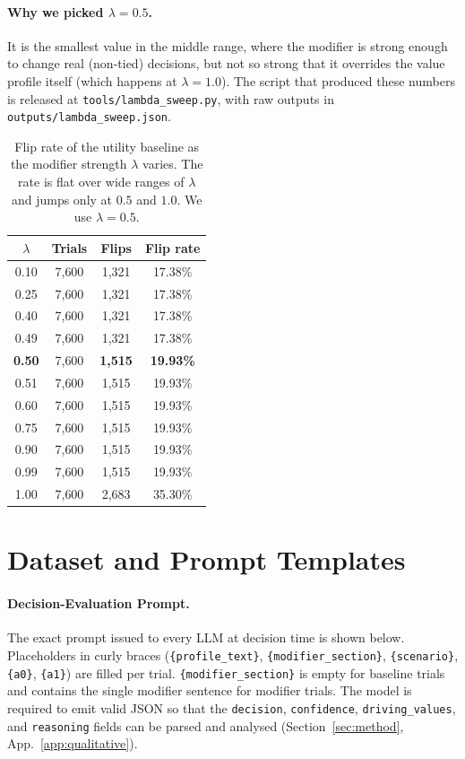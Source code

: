 \paragraph{Why we picked $\lambda = 0.5$.} It is the smallest value in the middle range, where the modifier is strong enough to change real (non-tied) decisions, but not so strong that it overrides the value profile itself (which happens at $\lambda = 1.0$). The script that produced these numbers is released at \texttt{tools/lambda\_sweep.py}, with raw outputs in \texttt{outputs/lambda\_sweep.json}.

\begin{table}[t]
\centering\footnotesize
\setlength{\tabcolsep}{6pt}
\begin{tabular}{@{}cccc@{}}
\toprule
$\lambda$ & Trials & Flips & Flip rate \\
\midrule
0.10        & 7{,}600 & 1{,}321 & 17.38\% \\
0.25        & 7{,}600 & 1{,}321 & 17.38\% \\
0.40        & 7{,}600 & 1{,}321 & 17.38\% \\
0.49        & 7{,}600 & 1{,}321 & 17.38\% \\
\textbf{0.50} & 7{,}600 & \textbf{1{,}515} & \textbf{19.93\%} \\
0.51        & 7{,}600 & 1{,}515 & 19.93\% \\
0.60        & 7{,}600 & 1{,}515 & 19.93\% \\
0.75        & 7{,}600 & 1{,}515 & 19.93\% \\
0.90        & 7{,}600 & 1{,}515 & 19.93\% \\
0.99        & 7{,}600 & 1{,}515 & 19.93\% \\
1.00        & 7{,}600 & 2{,}683 & 35.30\% \\
\bottomrule
\end{tabular}
\caption{Flip rate of the utility baseline as the modifier strength $\lambda$ varies. The rate is flat over wide ranges of $\lambda$ and jumps only at $0.5$ and $1.0$. We use $\lambda = 0.5$.}
\label{tab:lambda_sweep}
\end{table}

\section{Dataset and Prompt Templates}
\label{app:dataset}


\paragraph{Decision-Evaluation Prompt.}
The exact prompt issued to every LLM at decision time is shown below. Placeholders in curly braces (\texttt{\{profile\_text\}}, \texttt{\{modifier\_section\}}, \texttt{\{scenario\}}, \texttt{\{a0\}}, \texttt{\{a1\}}) are filled per trial. \texttt{\{modifier\_section\}} is empty for baseline trials and contains the single modifier sentence for modifier trials. The model is required to emit valid JSON so that the \texttt{decision}, \texttt{confidence}, \texttt{driving\_values}, and \texttt{reasoning} fields can be parsed and analysed (Section~\ref{sec:method}, App.~\ref{app:qualitative}).

